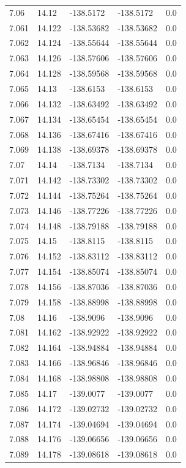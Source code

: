 \begin{tabular}{lllll}
7.06 & 14.12 & -138.5172 & -138.5172 & 0.0 \\
7.061 & 14.122 & -138.53682 & -138.53682 & 0.0 \\
7.062 & 14.124 & -138.55644 & -138.55644 & 0.0 \\
7.063 & 14.126 & -138.57606 & -138.57606 & 0.0 \\
7.064 & 14.128 & -138.59568 & -138.59568 & 0.0 \\
7.065 & 14.13 & -138.6153 & -138.6153 & 0.0 \\
7.066 & 14.132 & -138.63492 & -138.63492 & 0.0 \\
7.067 & 14.134 & -138.65454 & -138.65454 & 0.0 \\
7.068 & 14.136 & -138.67416 & -138.67416 & 0.0 \\
7.069 & 14.138 & -138.69378 & -138.69378 & 0.0 \\
7.07 & 14.14 & -138.7134 & -138.7134 & 0.0 \\
7.071 & 14.142 & -138.73302 & -138.73302 & 0.0 \\
7.072 & 14.144 & -138.75264 & -138.75264 & 0.0 \\
7.073 & 14.146 & -138.77226 & -138.77226 & 0.0 \\
7.074 & 14.148 & -138.79188 & -138.79188 & 0.0 \\
7.075 & 14.15 & -138.8115 & -138.8115 & 0.0 \\
7.076 & 14.152 & -138.83112 & -138.83112 & 0.0 \\
7.077 & 14.154 & -138.85074 & -138.85074 & 0.0 \\
7.078 & 14.156 & -138.87036 & -138.87036 & 0.0 \\
7.079 & 14.158 & -138.88998 & -138.88998 & 0.0 \\
7.08 & 14.16 & -138.9096 & -138.9096 & 0.0 \\
7.081 & 14.162 & -138.92922 & -138.92922 & 0.0 \\
7.082 & 14.164 & -138.94884 & -138.94884 & 0.0 \\
7.083 & 14.166 & -138.96846 & -138.96846 & 0.0 \\
7.084 & 14.168 & -138.98808 & -138.98808 & 0.0 \\
7.085 & 14.17 & -139.0077 & -139.0077 & 0.0 \\
7.086 & 14.172 & -139.02732 & -139.02732 & 0.0 \\
7.087 & 14.174 & -139.04694 & -139.04694 & 0.0 \\
7.088 & 14.176 & -139.06656 & -139.06656 & 0.0 \\
7.089 & 14.178 & -139.08618 & -139.08618 & 0.0 \\

\end{tabular}
